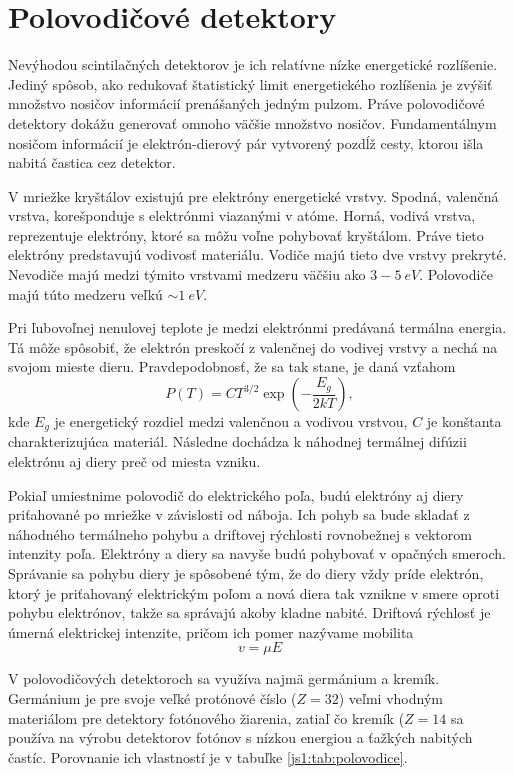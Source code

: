 \documentclass[../../main.tex]{subfiles}
\begin{document}
\section{Polovodičové detektory}

Nevýhodou scintilačných detektorov je ich relatívne nízke energetické rozlíšenie. Jediný spôsob, ako redukovať štatistický limit energetického rozlíšenia je zvýšiť množstvo nosičov informácií prenášaných jedným pulzom. Práve polovodičové detektory dokážu generovať omnoho väčšie množstvo nosičov. Fundamentálnym nosičom informácií je elektrón-dierový pár vytvorený pozdĺž cesty, ktorou išla nabitá častica cez detektor. 

V mriežke kryštálov existujú pre elektróny energetické vrstvy. Spodná, valenčná vrstva, korešponduje s elektrónmi viazanými v atóme. Horná, vodivá vrstva, reprezentuje elektróny, ktoré sa môžu voľne pohybovať kryštálom. Práve tieto elektróny predstavujú vodivosť materiálu. Vodiče majú tieto dve vrstvy prekryté. Nevodiče majú medzi týmito vrstvami medzeru väčšiu ako $3-5\:\unit{eV}$. Polovodiče majú túto medzeru veľkú $\sim 1\:\unit{eV}$.

Pri ľubovoľnej nenulovej teplote je medzi elektrónmi predávaná termálna energia. Tá môže spôsobiť, že elektrón preskočí z valenčnej do vodivej vrstvy a nechá na svojom mieste dieru. Pravdepodobnosť, že sa tak stane, je daná vzťahom
\begin{equation}
P(T)=CT^{3/2}\exp\left(-\dfrac{E_g}{2kT}\right),
\end{equation}
kde $E_g$ je energetický rozdiel medzi valenčnou a vodivou vrstvou, $C$ je konštanta charakterizujúca materiál. Následne dochádza k náhodnej termálnej difúzii elektrónu aj diery preč od miesta vzniku. 

Pokiaľ umiestnime polovodič do elektrického poľa, budú elektróny aj diery priťahované po mriežke v závislosti od náboja. Ich pohyb sa bude skladať z náhodného termálneho pohybu a driftovej rýchlosti rovnobežnej s vektorom intenzity poľa. Elektróny a diery sa navyše budú pohybovať v opačných smeroch. Správanie sa pohybu diery je spôsobené tým, že do diery vždy príde elektrón, ktorý je priťahovaný elektrickým poľom a nová diera tak vznikne v smere oproti pohybu elektrónov, takže sa správajú akoby kladne nabité. Driftová rýchlosť je úmerná elektrickej intenzite, pričom ich pomer nazývame mobilita
\begin{equation}
v=\mu E
\end{equation}

V polovodičových detektoroch sa využíva najmä germánium a kremík. Germánium je pre svoje veľké protónové číslo ($Z=32$) veľmi vhodným materiálom pre detektory fotónového žiarenia, zatiaľ čo kremík ($Z=14$ sa používa na výrobu detektorov fotónov s nízkou energiou a ťažkých nabitých častíc. Porovnanie ich vlastností je v tabuľke \ref{js1:tab:polovodice}.
\end{document}
